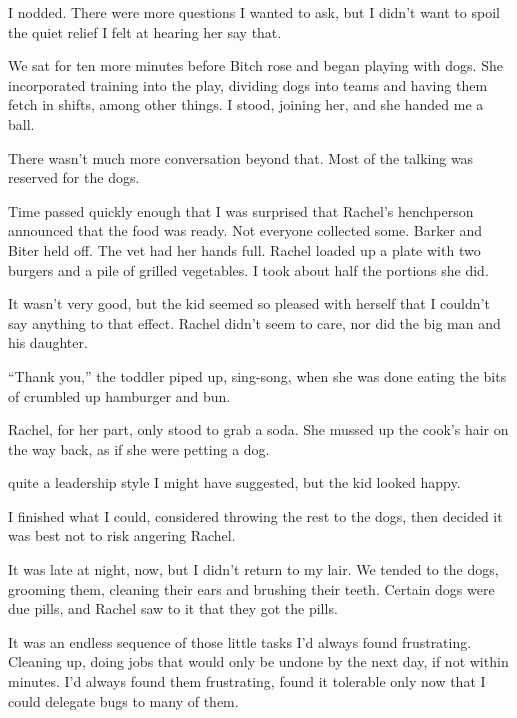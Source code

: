 I nodded.  There were more questions I wanted to ask, but I didn't want to spoil the quiet relief I felt at hearing her say that.



We sat for ten more minutes before Bitch rose and began playing with dogs.  She incorporated training into the play, dividing dogs into teams and having them fetch in shifts, among other things.  I stood, joining her, and she handed me a ball.



There wasn't much more conversation beyond that.  Most of the talking was reserved for the dogs.



Time passed quickly enough that I was surprised that Rachel's henchperson announced that the food was ready.  Not everyone collected some.  Barker and Biter held off.  The vet had her hands full.  Rachel loaded up a plate with two burgers and a pile of grilled vegetables.  I took about half the portions she did.



It wasn't very good, but the kid seemed so pleased with herself that I couldn't say anything to that effect.  Rachel didn't seem to care, nor did the big man and his daughter.



``Thank you,'' the toddler piped up, sing-song, when she was done eating the bits of crumbled up hamburger and bun.



Rachel, for her part, only stood to grab a soda.  She mussed up the cook's hair on the way back, as if she were petting a dog.



\ldotsNot quite a leadership style I might have suggested, but the kid looked happy.



I finished what I could, considered throwing the rest to the dogs, then decided it was best not to risk angering Rachel.



It was late at night, now, but I didn't return to my lair.  We tended to the dogs, grooming them, cleaning their ears and brushing their teeth.  Certain dogs were due pills, and Rachel saw to it that they got the pills.



It was an endless sequence of those little tasks I'd always found frustrating.  Cleaning up, doing jobs that would only be undone by the next day, if not within minutes.  I'd always found them frustrating, found it tolerable only now that I could delegate bugs to many of them.




